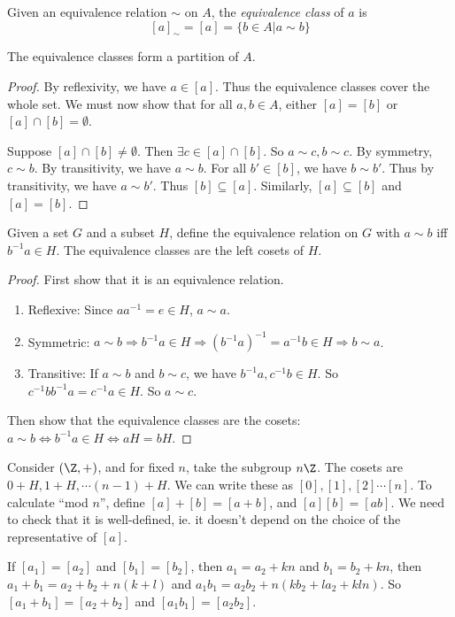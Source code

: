 \documentclass[a4paper]{article}
\begin{document}
  \begin{defi}
    Given an equivalence relation $\sim$ on $A$, the \emph{equivalence class} of $a$ is
    \[
      [a]_{\sim} = [a] = \{b\in A|a\sim b\}
    \]
  \end{defi}

  \begin{prop}
    The equivalence classes form a partition of $A$.
  \end{prop}

  \begin{proof}
    By reflexivity, we have $a\in [a]$. Thus the equivalence classes cover the whole set. We must now show that for all $a, b\in A$, either $[a] = [b]$ or $[a]\cap [b]=\emptyset$.

    Suppose $[a]\cap[b]\not=\emptyset$. Then $\exists c\in [a]\cap[b]$. So $a\sim c, b\sim c$. By symmetry, $c\sim b$. By transitivity, we have $a\sim b$. For all $b'\in [b]$, we have $b\sim b'$. Thus by transitivity, we have $a\sim b'$. Thus $[b]\subseteq[a]$. Similarly, $[a]\subseteq[b]$  and $[a] = [b]$.
  \end{proof}

  \begin{lemma}
    Given a set $G$ and a subset $H$, define the equivalence relation on $G$ with $a\sim b$ iff $b^{-1}a\in H$. The equivalence classes are the left cosets of $H$.
  \end{lemma}

  \begin{proof}
    First show that it is an equivalence relation.
    \begin{enumerate}
      \item Reflexive: Since $aa^{-1} = e\in H$,  $a\sim a$.
      \item Symmetric: $a\sim b\Rightarrow b^{-1}a\in H \Rightarrow (b^{-1}a)^{-1} = a^{-1}b\in H\Rightarrow b\sim a$.
      \item Transitive: If $a\sim b$ and $b\sim c$, we have $b^{-1}a, c^{-1}b\in H$. So $c^{-1}bb^{-1}a = c^{-1}a\in H$. So $a\sim c$.
    \end{enumerate}
    Then show that the equivalence classes are the cosets: $a\sim b\Leftrightarrow b^{-1}a\in H \Leftrightarrow aH = bH$.
  \end{proof}

  \begin{eg}
    Consider $(\Z, +)$, and for fixed $n$, take the subgroup $n\Z$. The cosets are $0+ H, 1 + H, \cdots (n - 1)+H$. We can write these as $[0], [1], [2] \cdots [n]$. To calculate ``mod $n$'', define $[a] + [b] = [a + b]$, and $[a][b] = [ab]$. We need to check that it is well-defined, ie. it doesn't depend on the choice of the representative of $[a]$.

    If $[a_1] = [a_2]$ and $[b_1] = [b_2]$, then $a_1 = a_2 + kn$ and $b_1 = b_2 + kn$, then $a_1 + b_1 = a_2 + b_2 + n(k + l)$ and $a_1b_1 = a_2b_2 + n(kb_2 +la_2 + kln)$. So $[a_1 + b_1] = [a_2 + b_2]$ and $[a_1b_1] = [a_2b_2]$.
  \end{eg}
\end{document}
